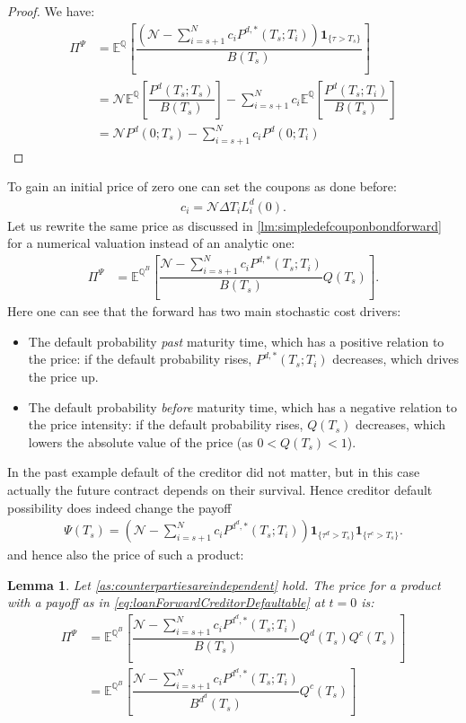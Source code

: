 \documentclass[12pt]{article}
\newtheorem{lemma}[theorem]{Lemma}
\begin{document}
	\begin{proof}
		We have:
		\begin{align*}
			\Pi^\Psi &= \mathbb{E}^{\mathbb{Q}}\left[\dfrac{\left(\mathcal{N} - \sum_{i=s+1}^{N}c_iP^{d,*}(T_s; T_i)\right)\mathbf{1}_{\{\tau > T_s\}}}{B(T_s)}\right]\\
			&=\mathcal{N}\mathbb{E}^{\mathbb{Q}}\left[\dfrac{P^d(T_s;T_s)}{B(T_s)}\right] - \sum_{i=s+1}^{N} c_i \mathbb{E}^{\mathbb{Q}}\left[\dfrac{P^d(T_s;T_i)}{B(T_s)}\right]\\
			&= \mathcal{N}P^d(0;T_s) - \sum_{i=s+1}^{N} c_i P^d(0;T_i)
		\end{align*}
	\end{proof}
	To gain an initial price of zero one can set the coupons as done before:
	\begin{align*}
		c_i = \mathcal{N}\Delta T_iL^d_i(0).
	\end{align*}
	Let us rewrite the same price as discussed in \cref{lm:simpledefcouponbondforward} for a numerical valuation instead of an analytic one:
	\begin{align*}
		\Pi^\Psi &= \mathbb{E}^{\mathbb{Q}^B}\left[\dfrac{\mathcal{N} - \sum_{i=s+1}^{N}c_iP^{d,*}(T_s; T_i)}{B(T_s)}Q(T_s)\right].
	\end{align*}
	Here one can see that the forward has two main stochastic cost drivers: 
	\begin{itemize}
		\item The default probability \emph{past} maturity time, which has a positive relation to the price: if the default probability rises, $P^{d,*}(T_s;T_i)$ decreases, which drives the price up.
		\item The default probability \emph{before} maturity time, which has a negative relation to the price intensity: if the default probability rises, $Q(T_s)$ decreases, which lowers the absolute value of the price (as $0 < Q(T_s) < 1$).
	\end{itemize}
	In the past example default of the creditor did not matter, but in this case actually the future contract depends on their survival. Hence creditor default possibility does indeed change the payoff
	\begin{align}\label{eq:loanForwardCreditorDefaultable}
		\Psi(T_s) = \left(\mathcal{N} - \sum_{i=s+1}^{N}c_iP^{d^d,*}(T_s; T_i)\right)\mathbf{1}_{\{\tau^d > T_s\}}\mathbf{1}_{\{\tau^c > T_s\}}.
	\end{align}
	and hence also the price of such a product:
	\begin{lemma}
		Let \cref{as:counterpartiesareindependent} hold. The price for a product with a payoff as in \cref{eq:loanForwardCreditorDefaultable} at $t=0$ is:
		\begin{align*}
			\Pi^\Psi &= \mathbb{E}^{\mathbb{Q}^B}\left[\dfrac{\mathcal{N} - \sum_{i=s+1}^{N}c_iP^{d^d,*}(T_s; T_i)}{B(T_s)}Q^d(T_s)Q^c(T_s)\right]\\
			&= \mathbb{E}^{\mathbb{Q}^B}\left[\dfrac{\mathcal{N} - \sum_{i=s+1}^{N}c_iP^{d^d,*}(T_s; T_i)}{B^{d^d}(T_s)}Q^c(T_s)\right]
		\end{align*}
	\end{lemma}
\end{document}
